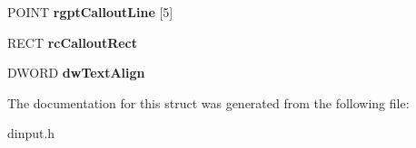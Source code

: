 \begin{DoxyCompactItemize}
\item 
\hypertarget{struct___d_i_d_e_v_i_c_e_i_m_a_g_e_i_n_f_o_a_a6d10e3b6bfb7e4bd373be9369b9aefa6}{P\-O\-I\-N\-T {\bfseries rgpt\-Callout\-Line} \mbox{[}5\mbox{]}}\label{struct___d_i_d_e_v_i_c_e_i_m_a_g_e_i_n_f_o_a_a6d10e3b6bfb7e4bd373be9369b9aefa6}

\item 
\hypertarget{struct___d_i_d_e_v_i_c_e_i_m_a_g_e_i_n_f_o_a_a5c9c7745ec2595925f35ece017eb150f}{R\-E\-C\-T {\bfseries rc\-Callout\-Rect}}\label{struct___d_i_d_e_v_i_c_e_i_m_a_g_e_i_n_f_o_a_a5c9c7745ec2595925f35ece017eb150f}

\item 
\hypertarget{struct___d_i_d_e_v_i_c_e_i_m_a_g_e_i_n_f_o_a_a2e2cccf84cdb572c322383a5963effae}{D\-W\-O\-R\-D {\bfseries dw\-Text\-Align}}\label{struct___d_i_d_e_v_i_c_e_i_m_a_g_e_i_n_f_o_a_a2e2cccf84cdb572c322383a5963effae}

\end{DoxyCompactItemize}


The documentation for this struct was generated from the following file\-:\begin{DoxyCompactItemize}
\item 
dinput.\-h\end{DoxyCompactItemize}
